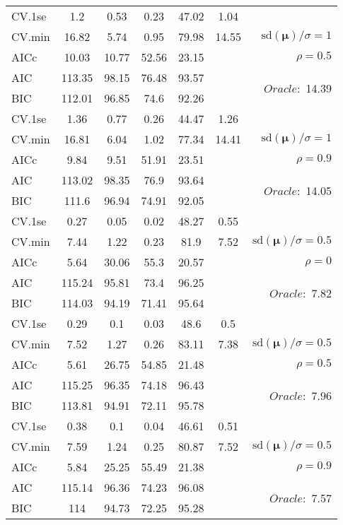 \begin{table}
\begin{center}
\begin{tabular}{l*{5}{c}|r}
 \hline 
CV.1se & 1.2 & 0.53 & 0.23 & 47.02 & 1.04 & \\
CV.min & 16.82 & 5.74 & 0.95 & 79.98 & 14.55 &  $\mathrm{sd}(\mathbf{\mu})/\sigma=1$ \\
AICc & 10.03 & 10.77 & 52.56 & 23.15 & & $\rho=0.5$ \\
AIC & 113.35 & 98.15 & 76.48 & 93.57 & &  \multirow{2}{*}{$Oracle: $ 14.39} \\
BIC & 112.01 & 96.85 & 74.6 & 92.26 & &  \\
 \hline 
CV.1se & 1.36 & 0.77 & 0.26 & 44.47 & 1.26 & \\
CV.min & 16.81 & 6.04 & 1.02 & 77.34 & 14.41 &  $\mathrm{sd}(\mathbf{\mu})/\sigma=1$ \\
AICc & 9.84 & 9.51 & 51.91 & 23.51 & & $\rho=0.9$ \\
AIC & 113.02 & 98.35 & 76.9 & 93.64 & &  \multirow{2}{*}{$Oracle: $ 14.05} \\
BIC & 111.6 & 96.94 & 74.91 & 92.05 & &  \\
 \hline 
CV.1se & 0.27 & 0.05 & 0.02 & 48.27 & 0.55 & \\
CV.min & 7.44 & 1.22 & 0.23 & 81.9 & 7.52 &  $\mathrm{sd}(\mathbf{\mu})/\sigma=0.5$ \\
AICc & 5.64 & 30.06 & 55.3 & 20.57 & & $\rho=0$ \\
AIC & 115.24 & 95.81 & 73.4 & 96.25 & &  \multirow{2}{*}{$Oracle: $ 7.82} \\
BIC & 114.03 & 94.19 & 71.41 & 95.64 & &  \\
 \hline 
CV.1se & 0.29 & 0.1 & 0.03 & 48.6 & 0.5 & \\
CV.min & 7.52 & 1.27 & 0.26 & 83.11 & 7.38 &  $\mathrm{sd}(\mathbf{\mu})/\sigma=0.5$ \\
AICc & 5.61 & 26.75 & 54.85 & 21.48 & & $\rho=0.5$ \\
AIC & 115.25 & 96.35 & 74.18 & 96.43 & &  \multirow{2}{*}{$Oracle: $ 7.96} \\
BIC & 113.81 & 94.91 & 72.11 & 95.78 & &  \\
 \hline 
CV.1se & 0.38 & 0.1 & 0.04 & 46.61 & 0.51 & \\
CV.min & 7.59 & 1.24 & 0.25 & 80.87 & 7.52 &  $\mathrm{sd}(\mathbf{\mu})/\sigma=0.5$ \\
AICc & 5.84 & 25.25 & 55.49 & 21.38 & & $\rho=0.9$ \\
AIC & 115.14 & 96.36 & 74.23 & 96.08 & &  \multirow{2}{*}{$Oracle: $ 7.57} \\
BIC & 114 & 94.73 & 72.25 & 95.28 & &  \\
 \hline 
\end{tabular}
\end{center}
\vspace{-1cm}
\end{table}




